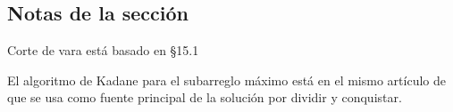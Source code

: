 \subsection*{Notas de la sección}

Corte de vara está basado en \textcite{cormen} \S 15.1

El algoritmo de Kadane para el subarreglo máximo está en el mismo artículo de \textcite{bentley} que se usa como fuente principal de la solución por dividir y conquistar.